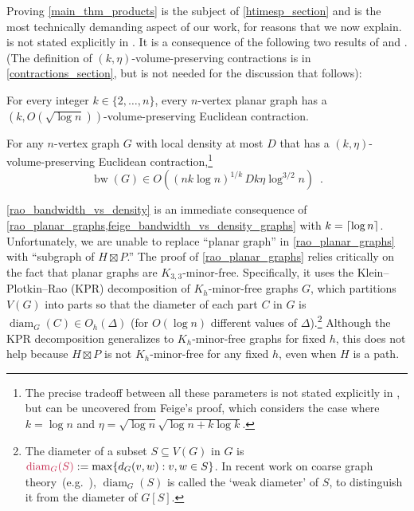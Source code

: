 \documentclass{patmorin}
\makeatletter
\def\mathcolor#1#{\@mathcolor{#1}}
\def\@mathcolor#1#2#3{%
  \protect\leavevmode
  \begingroup
    \color#1{#2}#3%
  \endgroup
}
\newcommand{\mathdefin}[1]{\mathcolor{brightmaroon}{#1}}
\DeclareMathOperator{\bw}{bw}
\DeclareMathOperator{\diam}{diam}
\makeatother
\begin{document}
Proving \cref{main_thm_products} is the subject of \cref{htimesp_section} and is the most technically demanding aspect of our work, for reasons that we now explain.
 is not stated explicitly in \cite{rao:small}.  It is a consequence of the following two results of \citet{feige:approximating} and \citet{rao:small}. (The definition of $(k,\eta)$-volume-preserving contractions is in \cref{contractions_section}, but is not needed for the  discussion that follows):

\begin{thm}\label{rao_planar_graphs}
    For every integer $k\in\{2,\ldots,n\}$, every $n$-vertex planar graph has a $(k,O(\sqrt{\log n}))$-volume-preserving Euclidean contraction.
\end{thm}

\begin{thm}\label{feige_bandwidth_vs_density_graphs}
    For any $n$-vertex graph $G$ with local density at most $D$ that has a $(k,\eta)$-volume-preserving Euclidean contraction,\footnote{The precise tradeoff between all these parameters is not stated explicitly in \cite{feige:approximating}, but can be uncovered from Feige's proof, which considers the case where $k=\log n$ and $\eta=\sqrt{\log n}\sqrt{\log n+ k\log k}$.}
    \[
        \bw(G) \in O((nk\log n)^{1/k}\,Dk\eta\log^{3/2} n) \enspace .
    \]
\end{thm}

\cref{rao_bandwidth_vs_density} is an immediate consequence of \cref{rao_planar_graphs,feige_bandwidth_vs_density_graphs} with $k={\lceil \log n \rceil}$.  Unfortunately, we are unable to replace ``planar graph'' in \cref{rao_planar_graphs} with ``subgraph of $H\boxtimes P$.''  The proof of \cref{rao_planar_graphs} relies critically on the fact that planar graphs are $K_{3,3}$-minor-free.  Specifically, it uses the Klein--Plotkin--Rao (KPR) decomposition \cite{klein.plotkin.ea:excluded} of $K_{h}$-minor-free graphs $G$, which partitions $V(G)$ into parts so that the diameter of each part $C$ in $G$ is $\diam_G(C)\in O_h(\Delta)$ (for $O(\log n)$ different values of $\Delta$).\footnote{The diameter of a subset $S\subseteq V(G)$ in $G$ is $\mathdefin{\diam_{G}(S)}:=\max\{d_G(v,w):v,w\in S\}$. In recent work on coarse graph theory~(e.g.~\citep{DN23,BBEGLPS}), $\diam_G(S)$ is called the `weak diameter' of $S$, to distinguish it from the diameter of $G[S]$.}  Although the KPR decomposition generalizes to $K_h$-minor-free graphs for fixed $h$, this does not help because $H\boxtimes P$ is not $K_h$-minor-free for any fixed $h$, even when $H$ is a path.
\end{document}
